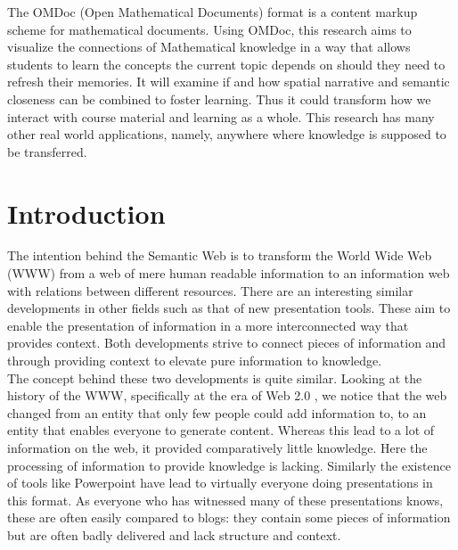 \documentclass[twoside]{article}
\begin{document}
The OMDoc (Open Mathematical Documents) format \cite{Kohlhase:OMDoc1.2} is a content markup scheme for mathematical documents. Using OMDoc, this research aims to visualize the connections of Mathematical knowledge in a way that allows students to learn the concepts the current topic depends on should they need to refresh their memories. It will examine if and how spatial narrative and semantic closeness can be combined to foster learning. Thus it could transform how we interact with course material and learning as a whole. This research has many other real world applications, namely, anywhere where knowledge is supposed to be transferred.\\ 

  \newpage
  \tableofcontents

  \clearpage

  \section{Introduction}
  \label{sec:introduction}

The intention behind the Semantic Web \cite{BernersLee:tsw98} is to transform the World Wide Web (WWW) from a web of mere human readable information to an information web with relations between different resources. There are an interesting similar developments in other fields such as that of new presentation tools. These aim to enable the presentation of information in a more interconnected way that provides context. Both developments strive to connect pieces of information and through providing context to elevate pure information to knowledge.\\

The concept behind these two developments is quite similar. Looking at the history of the WWW, specifically at the era of Web 2.0 \cite{Weller:npentrel14}, we notice that the web changed from an entity that only few people could add information to, to an entity that enables everyone to generate content. Whereas this lead to a lot of information on the web, it provided comparatively little knowledge. Here the processing of information to provide knowledge is lacking. Similarly the existence of tools like Powerpoint have lead to virtually everyone doing presentations in this format. As everyone who has witnessed many of these presentations knows, these are often easily compared to blogs: they contain some pieces of information but are often badly delivered and lack structure and context. \\
\end{document}
